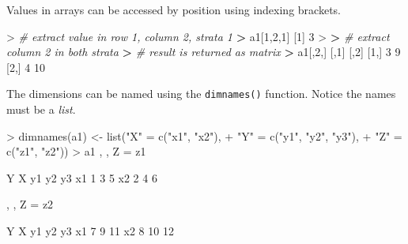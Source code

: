 \documentclass[
]{book}
\newenvironment{Shaded}{\begin{snugshade}}{\end{snugshade}}
\newcommand{\CommentTok}[1]{\textcolor[rgb]{0.56,0.35,0.01}{\textit{#1}}}
\newcommand{\DecValTok}[1]{\textcolor[rgb]{0.00,0.00,0.81}{#1}}
\newcommand{\ErrorTok}[1]{\textcolor[rgb]{0.64,0.00,0.00}{\textbf{#1}}}
\newcommand{\FunctionTok}[1]{\textcolor[rgb]{0.00,0.00,0.00}{#1}}
\newcommand{\NormalTok}[1]{#1}
\newcommand{\OtherTok}[1]{\textcolor[rgb]{0.56,0.35,0.01}{#1}}
\newcommand{\SpecialCharTok}[1]{\textcolor[rgb]{0.00,0.00,0.00}{#1}}
\newcommand{\StringTok}[1]{\textcolor[rgb]{0.31,0.60,0.02}{#1}}
\begin{document}
Values in arrays can be accessed by position using indexing brackets.

\begin{Shaded}
\begin{Highlighting}[]
\SpecialCharTok{\textgreater{}} \CommentTok{\# extract value in row 1, column 2, strata 1}
\ErrorTok{\textgreater{}}\NormalTok{ a1[}\DecValTok{1}\NormalTok{,}\DecValTok{2}\NormalTok{,}\DecValTok{1}\NormalTok{]}
\NormalTok{[}\DecValTok{1}\NormalTok{] }\DecValTok{3}
\SpecialCharTok{\textgreater{}} 
\ErrorTok{\textgreater{}} \CommentTok{\# extract column 2 in both strata}
\ErrorTok{\textgreater{}} \CommentTok{\# result is returned as matrix}
\ErrorTok{\textgreater{}}\NormalTok{ a1[,}\DecValTok{2}\NormalTok{,]}
\NormalTok{     [,}\DecValTok{1}\NormalTok{] [,}\DecValTok{2}\NormalTok{]}
\NormalTok{[}\DecValTok{1}\NormalTok{,]    }\DecValTok{3}    \DecValTok{9}
\NormalTok{[}\DecValTok{2}\NormalTok{,]    }\DecValTok{4}   \DecValTok{10}
\end{Highlighting}
\end{Shaded}

The dimensions can be named using the \texttt{dimnames()} function. Notice the names must be a \emph{list}.

\begin{Shaded}
\begin{Highlighting}[]
\SpecialCharTok{\textgreater{}} \FunctionTok{dimnames}\NormalTok{(a1) }\OtherTok{\textless{}{-}} \FunctionTok{list}\NormalTok{(}\StringTok{"X"} \OtherTok{=} \FunctionTok{c}\NormalTok{(}\StringTok{"x1"}\NormalTok{, }\StringTok{"x2"}\NormalTok{), }
\SpecialCharTok{+}                      \StringTok{"Y"} \OtherTok{=} \FunctionTok{c}\NormalTok{(}\StringTok{"y1"}\NormalTok{, }\StringTok{"y2"}\NormalTok{, }\StringTok{"y3"}\NormalTok{), }
\SpecialCharTok{+}                      \StringTok{"Z"} \OtherTok{=} \FunctionTok{c}\NormalTok{(}\StringTok{"z1"}\NormalTok{, }\StringTok{"z2"}\NormalTok{))}
\SpecialCharTok{\textgreater{}}\NormalTok{ a1}
\NormalTok{, , Z }\OtherTok{=}\NormalTok{ z1}

\NormalTok{    Y}
\NormalTok{X    y1 y2 y3}
\NormalTok{  x1  }\DecValTok{1}  \DecValTok{3}  \DecValTok{5}
\NormalTok{  x2  }\DecValTok{2}  \DecValTok{4}  \DecValTok{6}

\NormalTok{, , Z }\OtherTok{=}\NormalTok{ z2}

\NormalTok{    Y}
\NormalTok{X    y1 y2 y3}
\NormalTok{  x1  }\DecValTok{7}  \DecValTok{9} \DecValTok{11}
\NormalTok{  x2  }\DecValTok{8} \DecValTok{10} \DecValTok{12}
\end{Highlighting}
\end{Shaded}
\end{document}
